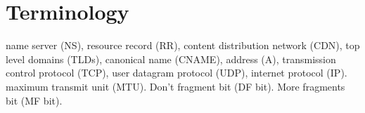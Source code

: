\section{Terminology}
name server (NS), resource record (RR), content distribution network
(CDN), top level domains (TLDs), canonical name (CNAME), address (A),
transmission control protocol (TCP), user datagram protocol (UDP),
internet protocol (IP). maximum transmit unit (MTU). Don't fragment bit
(DF bit). More fragments bit (MF bit).